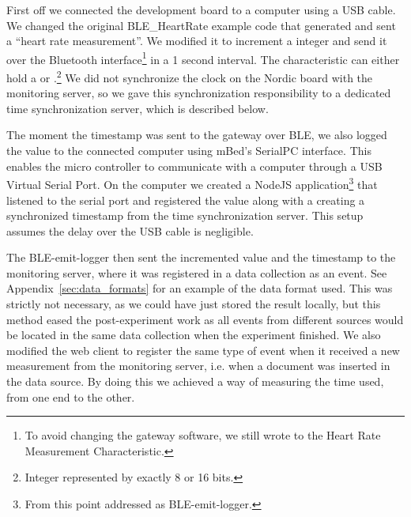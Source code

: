 First off we connected the development board to a computer using a USB cable. We changed the original BLE\_HeartRate example code that generated and sent a ``heart rate measurement''. We modified it to increment a  integer and send it over the Bluetooth interface\footnote{ To avoid changing the gateway software, we still wrote to the Heart Rate Measurement Characteristic.} in a 1 second interval. The characteristic can either hold a  or .\footnote{ Integer represented by exactly 8 or 16 bits.} We did not synchronize the clock on the Nordic board with the monitoring server, so we gave this synchronization responsibility to a dedicated time synchronization server, which is described below.

The moment the timestamp was sent to the gateway over BLE, we also logged the value to the connected computer using mBed's SerialPC interface. This enables the micro controller to communicate with a computer through a USB Virtual Serial Port. On the computer we created a NodeJS application\footnote{ From this point addressed as BLE-emit-logger.} that listened to the serial port and registered the value along with a creating a synchronized timestamp from the time synchronization server. This setup assumes the delay over the USB cable is negligible. 

The BLE-emit-logger then sent the incremented value and the timestamp to the monitoring server, where it was registered in a data collection as an event. See Appendix~\ref{sec:data_formats} for an example of the data format used. This was strictly not necessary, as we could have just stored the result locally, but this method eased the post-experiment work as all events from different sources would be located in the same data collection when the experiment finished. We also modified the web client to register the same type of event when it received a new measurement from the monitoring server, i.e. when a document was inserted in the data source. By doing this we achieved a way of measuring the time used, from one end to the other.

